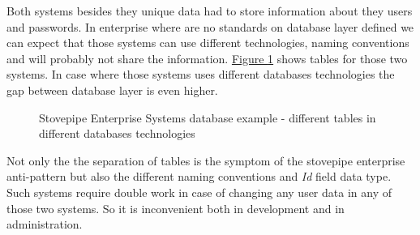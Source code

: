 Both systems besides they unique data had to store information about they users and passwords. In enterprise where are no standards on database layer defined we can expect that those systems can use different technologies, naming conventions and will probably not share the information. 
\hyperref[fig:DatabaseExample]{Figure \ref{fig:DatabaseExample}} shows tables for those two systems. In case where those systems uses different databases technologies the gap between database layer is even higher.

\begin{figure}[htp]
\hfill%
%
\caption[Stovepipe Enterprise Systems database example]{Stovepipe Enterprise Systems database example - different tables in different databases technologies}
\label{fig:DatabaseExample}
\end{figure}

Not only the the separation of tables is the symptom of the stovepipe enterprise anti-pattern but also the different naming conventions and \emph{Id} field data type.
Such systems require double work in case of changing any user data in any of those two systems. So it is inconvenient both in development and in administration.

